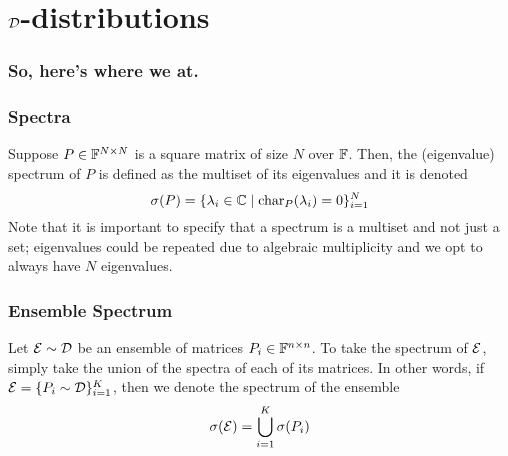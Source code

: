 

\section{$\mathcal{D}$-distributions}
\begin{frame}
\frametitle{So, here's where we at.}
\end{frame}
\begin{frame} \frametitle{Spectra}

\begin{alertblock}{}
Suppose $P \in \mathbb{F}^{N \times N}$ is a square matrix of size $N$ over $\mathbb{F}$. Then, the (eigenvalue) spectrum of $P$ is defined as the multiset of its eigenvalues and it is denoted
$$\sigma(P) = \{\lambda_i \in \mathbb{C} \mid \text{char}_P(\lambda_i) = 0 \}_{i=1}^N$$
Note that it is important to specify that a spectrum is a multiset and not just a set; eigenvalues could be repeated due to algebraic multiplicity and we opt to always have $N$ eigenvalues.
\end{alertblock}

\end{frame}
\begin{frame} \frametitle{Ensemble Spectrum}

\begin{alertblock}{}
Let $\mathcal{E} \sim \mathcal{D}$ be an ensemble of matrices $P_i \in \mathbb{F}^{n \times n}$. To take the spectrum of $\mathcal{E}$, simply take the union of the spectra of each of its matrices.
In other words, if $\mathcal{E} = \{P_i \sim \mathcal{D}\}_{i = 1}^K$, then we denote the spectrum of the ensemble
$$\sigma(\mathcal{E}) = \bigcup_{i=1}^K \sigma(P_i)$$
\end{alertblock}

\end{frame}




